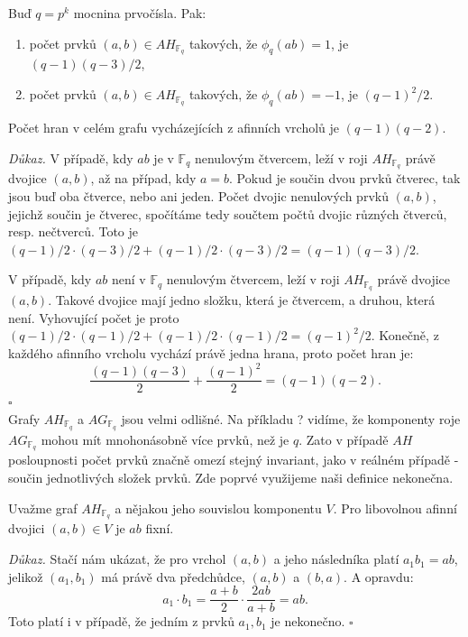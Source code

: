 \documentclass[12pt]{report}
\begin{document}
\begin{veta}
Buď $q = p^k$ mocnina prvočísla. Pak:
\begin{enumerate}
\item počet prvků $(a,b) \in AH_{\mathbb{F}_q}$ takových, že $\phi_q(ab) = 1$, je $(q-1)(q-3)/2$, 
\item počet prvků $(a,b) \in AH_{\mathbb{F}_q}$ takových, že $\phi_q(ab) = -1$, je $(q-1)^2/2$.
\end{enumerate}
Počet hran v celém grafu vycházejících z afinních vrcholů je $(q-1)(q-2)$.
\end{veta}  
\noindent \textit{Důkaz.} V případě, kdy $ab$ je v $\mathbb{F}_q$ nenulovým čtvercem, leží v roji $AH_{\mathbb{F}_q}$ právě dvojice $(a,b)$, až na případ, kdy $a=b$. Pokud je součin dvou prvků čtverec, tak jsou buď oba čtverce, nebo ani jeden. Počet dvojic nenulových prvků $(a,b)$, jejichž součin je čtverec, spočítáme tedy součtem počtů dvojic různých čtverců, resp. nečtverců. Toto je $(q-1)/2 \cdot (q-3)/2 + (q-1)/2 \cdot (q-3)/2 =  (q-1)(q-3)/2$.

V případě, kdy $ab$ není v $\mathbb{F}_q$ nenulovým čtvercem, leží v roji $AH_{\mathbb{F}_q}$ právě dvojice $(a,b)$. Takové dvojice mají jedno složku, která je čtvercem, a druhou, která není. Vyhovující počet je proto $(q-1)/2 \cdot (q-1)/2 + (q-1)/2 \cdot (q-1)/2 = (q-1)^2/2$. Konečně, z každého afinního vrcholu vychází právě jedna hrana, proto počet hran je:
$$\frac{(q-1)(q-3)}{2}+\frac{(q-1)^2}{2} = (q-1)(q-2).$$  \hfill $\square$\\



Grafy $AH_{\mathbb{F}_q}$ a $AG_{\mathbb{F}_q}$ jsou velmi odlišné. Na příkladu ? vidíme, že komponenty roje $AG_{\mathbb{F}_q}$ mohou mít mnohonásobně více prvků, než je $q$. Zato v případě $AH$ posloupnosti počet prvků značně omezí stejný invariant, jako v reálném případě - součin jednotlivých složek prvků. Zde poprvé využijeme naši definice nekonečna.

\begin{lemma}\label{fix}
Uvažme graf $AH_{\mathbb{F}_q}$ a nějakou jeho souvislou komponentu $V$. Pro libovolnou afinní dvojici $(a,b) \in V$ je $ab$ fixní.
\end{lemma}
\noindent \textit{Důkaz.} Stačí nám ukázat, že pro vrchol $(a,b)$ a jeho následníka platí $a_1 b_1 = ab$, jelikož $(a_1,b_1)$ má právě dva předchůdce, $(a,b)$ a $(b,a)$. A opravdu:
\begin{equation*}
a_1 \cdot b_1 = \frac{a+b}{2} \cdot \frac{2ab}{a+b} = ab.
\end{equation*} 
Toto platí i v případě, že jedním z prvků $a_1,b_1$ je nekonečno.
\hfill $\square$\\
\end{document}
